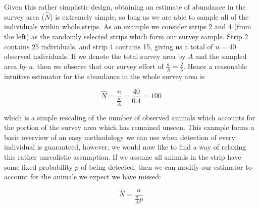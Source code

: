 \documentclass[11pt]{article}
\begin{document}
\begin{multicols}{2}
Given this rather simplistic design, obtaining an estimate of abundance in the survey area ($\hat{N}$) is extremely simple, so long as we are able to sample all of the individuals within whole strips. As an example we consider strips 2 and 4 (from the left) as the randomly selected strips which form our survey sample. Strip 2 contains 25 individuals, and strip 4 contains 15, giving us a total of $n=40$ observed individuals. If we denote the total survey area by $A$ and the sampled area by $a$, then we observe that our survey effort of $\frac{a}{A}=\frac{2}{5}$. Hence a reasonable intuitive estimator for the abundance in the whole survey area is

\begin{equation}
\hat{N}=\frac{n}{\frac{a}{A}}=\frac{40}{0.4}=100
\end{equation}

which is a simple rescaling of the number of observed animals which accounts for the portion of the survey area which has remained unseen. This example forms a basic overview of an easy methodology we can use when detection of every individual is guaranteed, however, we would now like to find a way of relaxing this rather unrealistic assumption. If we assume all animals in the strip have some fixed probability $p$ of being detected, then we can modify our estimator to account for the animals we expect we have missed:

\begin{equation}
\hat{N}=\frac{n}{\frac{a}{A}p}
\end{equation} 



\end{multicols}
\end{document}
